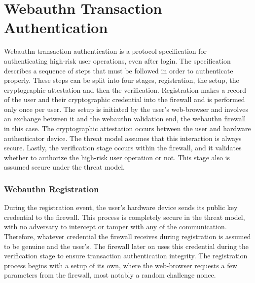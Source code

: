\chapter{Webauthn Transaction Authentication}\label{Chap:WebauthnTransactionAuthentication}

Webauthn transaction authentication is a protocol specification for authenticating high-risk user operations, even after login. The specification describes a sequence of steps that must be followed in order to authenticate properly. These steps can be split into four stages, registration, the setup, the cryptographic attestation and then the verification. Registration makes a record of the user and their cryptographic credential into the firewall and is performed only once per user. The setup is initiated by the user's web-browser and involves an exchange between it and the webauthn validation end, the webauthn firewall in this case. The cryptographic attestation occurs between the user and hardware authenticator device. The threat model assumes that this interaction is always secure. Lastly, the verification stage occurs within the firewall, and it validates whether to authorize the high-risk user operation or not. This stage also is assumed secure under the threat model.

\subsection{Webauthn Registration}

During the registration event, the user's hardware device sends its public key credential to the firewall. This process is completely secure in the threat model, with no adversary to intercept or tamper with any of the communication. Therefore, whatever credential the firewall receives during registration is assumed to be genuine and the user's. The firewall later on uses this credential during the verification stage to ensure transaction authentication integrity. The registration process begins with a setup of its own, where the web-browser requests a few parameters from the firewall, most notably a random challenge nonce.



